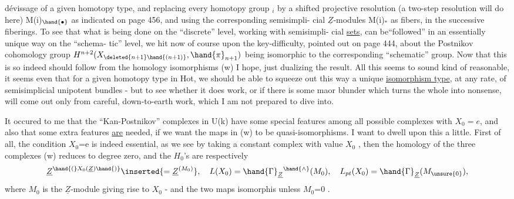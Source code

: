 dévissage of a given homotopy type,  and replacing every homotopy group \hand{$\pi$}$_i$
by a shifted projective resolution (a two-step resolution will do here)
M(i)$_{\hand{\bullet}}$\hand{,}  as indicated on page 456,  and using the corresponding semisimpli-%
cial $\underline{Z}$-modules  M(i)$_*$  as fibers,  in the successive fiberings.  To see
that what is being done on the ``discrete'' level,  working with semisimpli-%
cial \uline{sets},  can be``followed'' in an essentially unique way on the ``schema-%
tic'' level,  we hit now of course upon the key-difficulty,  pointed out
on page 444,  about the Postnikov cohomology group $H^{n+2}(X_{\deleted{n+1}\hand{(n+1)}},\hand{\pi}_{n+1})$
being isomorphic to the corresponding ``schematic'' group.  Now that this is
so indeed should follow from the homology isomorphisms (w) I hope,
 just dualizing the result.  All this seems to
sound kind of reasonable,  it seems even that for a given homotopy type
in Hot,  we should be able to squeeze out this way a unique \uline{isomorphism
type},  at any rate,  of semisimplicial unipotent bundles  -  but to see
whether it does work,  or if there is some maor blunder which turns
the whole into nonsense,  will come out only from careful, down-to-earth
work,  which I am not prepared to dive into.

It occured to me that the ``Kan-Postnikov'' complexes in U(k) have
some special features among all possible complexes with $X_0 = e$,  and also
that some extra features \uline{are}  needed,  if we want the maps in (w) to be
quasi-isomorphisms.  I want to dwell upon this a little.  First of all,
the condition  $X_0$=e is indeed essential,  as we see by taking a constant
complex with value $X_0$ ,  then the homology of the three complexes
(w)  reduces to degree zero,  and the $H_0$'s are respectively
\[ \underline{Z}^{\hand{(}X_0(\underline{Z})\hand{)}}\inserted{=\underline{Z}^{(M_0)}} ,\quad L(X_0) = \hand{\Gamma}_{\underline{Z}}{}^{\hand{\wedge}}(M_0) ,\quad L_{pt}(X_0) = \hand{\Gamma}_{\underline{Z}}(M_{\unsure{0}}) , \]
where $M_0$ is the $\underline{Z}$-module giving rise to $X_0$  -  and  the two maps 
 isomorphis\hand{,} unless $M_0$=0 .

